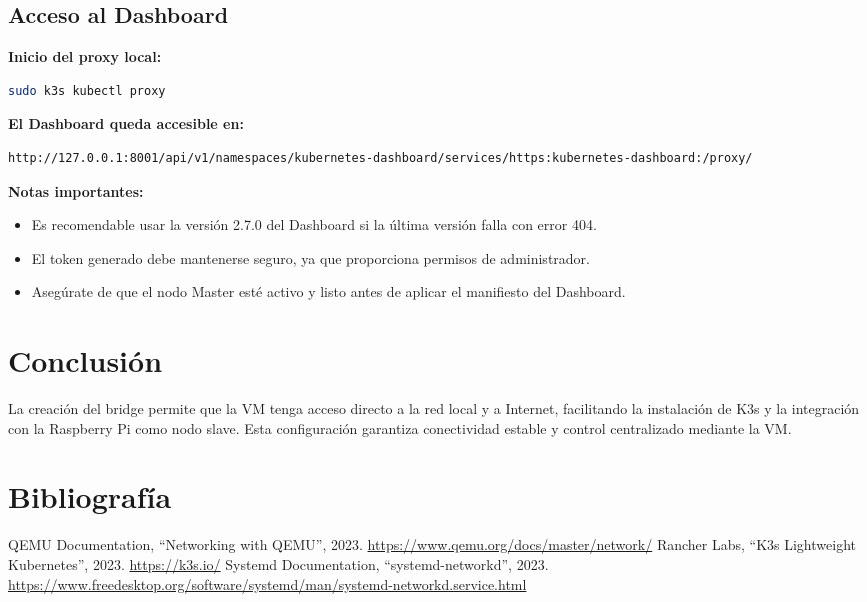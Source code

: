 \documentclass[12pt, a4paper]{article}
\begin{document}
\subsection{Acceso al Dashboard}

\textbf{Inicio del proxy local:}

\begin{lstlisting}[language=bash]
sudo k3s kubectl proxy
\end{lstlisting}

\textbf{El Dashboard queda accesible en:}

\begin{lstlisting}[language=bash]
http://127.0.0.1:8001/api/v1/namespaces/kubernetes-dashboard/services/https:kubernetes-dashboard:/proxy/
\end{lstlisting}

\textbf{Notas importantes:}
\begin{itemize}
    \item Es recomendable usar la versión 2.7.0 del Dashboard si la última versión falla con error 404.
    \item El token generado debe mantenerse seguro, ya que proporciona permisos de administrador.
    \item Asegúrate de que el nodo Master esté activo y listo antes de aplicar el manifiesto del Dashboard.
\end{itemize}

\section{Conclusión}

La creación del bridge permite que la VM tenga acceso directo a la red local y a Internet, facilitando la instalación de K3s y la integración con la Raspberry Pi como nodo slave. Esta configuración garantiza conectividad estable y control centralizado mediante la VM.

\clearpage
\section{Bibliografía}
\begin{thebibliography}{9}
QEMU Documentation, ``Networking with QEMU'', 2023. \url{https://www.qemu.org/docs/master/network/}
Rancher Labs, ``K3s Lightweight Kubernetes'', 2023. \url{https://k3s.io/}
Systemd Documentation, ``systemd-networkd'', 2023. \url{https://www.freedesktop.org/software/systemd/man/systemd-networkd.service.html}
\end{thebibliography}
\end{document}
